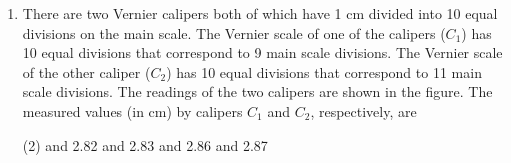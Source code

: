 \documentclass{article}
\begin{document}
\begin{enumerate}
    \item There are two Vernier calipers both of which have 1 cm divided into 10 equal divisions on the main scale. The Vernier scale of one of the calipers (\( C_1 \)) has 10 equal divisions that correspond to 9 main scale divisions. The Vernier scale of the other caliper (\( C_2 \)) has 10 equal divisions that correspond to 11 main scale divisions. The readings of the two calipers are shown in the figure. The measured values (in cm) by calipers \( C_1 \) and \( C_2 \), respectively, are
        \begin{tasks}(2)
             and 2.82
             and 2.83
             and 2.86
             and 2.87
        \end{tasks}
\end{enumerate}
\end{document}
